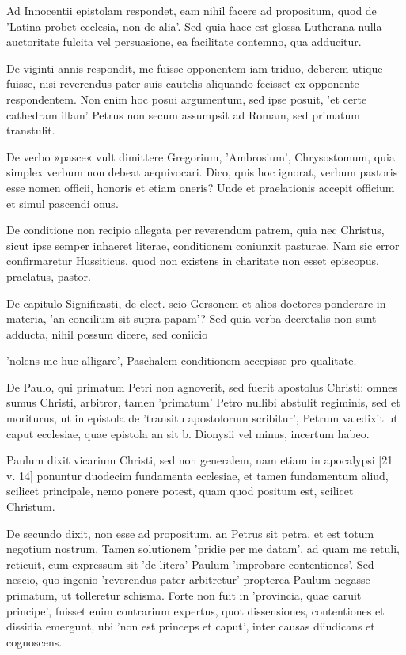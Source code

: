 Ad Innocentii epistolam respondet, eam nihil facere ad propositum, quod de 'Latina probet ecclesia, non de alia'. Sed quia haec est glossa Lutherana nulla auctoritate fulcita vel persuasione, ea facilitate contemno, qua adducitur.

De viginti annis respondit, me fuisse opponentem iam triduo, deberem utique fuisse, nisi reverendus pater suis cautelis aliquando fecisset ex oppo\marginpar{\small[312]}nente respondentem. Non enim hoc posui argumentum, sed ipse posuit, 'et certe cathedram illam' Petrus non secum assumpsit ad Romam, sed primatum transtulit.

De verbo »pasce« vult dimittere Gregorium, 'Ambrosium', Chrysostomum, quia simplex verbum non debeat aequivocari. Dico, quis hoc ignorat, verbum pastoris esse nomen officii, honoris et etiam oneris? Unde et praelationis accepit officium et simul pascendi onus.

De conditione non recipio allegata per reverendum patrem, quia nec Christus, sicut ipse semper inhaeret literae, conditionem coniunxit pasturae. Nam sic error confirmaretur Hussiticus, quod non existens in charitate non esset episcopus, praelatus, pastor.

De capitulo Significasti, de elect. scio Gersonem et alios doctores ponderare in materia, 'an concilium sit supra papam'? Sed quia verba decretalis non sunt adducta, nihil possum dicere, sed coniicio

'nolens me huc alligare', Paschalem conditionem accepisse pro qualitate.

De Paulo, qui primatum Petri non agnoverit, sed fuerit apostolus Christi: omnes sumus Christi, arbitror, tamen 'primatum' Petro nullibi abstulit regiminis, sed et moriturus, ut in epistola de 'transitu apostolorum scribitur', Petrum valedixit ut caput ecclesiae, quae epistola an sit b. Dionysii vel minus, incertum habeo.

Paulum dixit vicarium Christi, sed non generalem, nam etiam in apocalypsi [21 v. 14] ponuntur duodecim fundamenta ecclesiae, et tamen fundamentum aliud, scilicet principale, nemo ponere potest, quam quod positum est, scilicet Christum.

De secundo dixit, non esse ad propositum, an Petrus sit petra, et est totum negotium nostrum. Tamen solutionem 'pridie per me datam', ad quam me retuli, reticuit, cum expressum sit 'de litera' Paulum 'improbare contentiones'. Sed nescio, quo ingenio 'reverendus pater arbitretur' propterea Paulum negasse primatum, ut tolleretur schisma. Forte non fuit in 'provincia, quae caruit principe', fuisset enim contrarium expertus, quot dissensiones, contentiones et dissidia emergunt, ubi 'non est princeps et caput', inter causas diiudicans et cognoscens.

